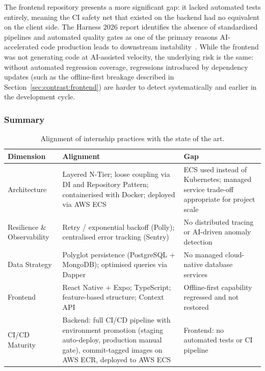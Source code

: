 The frontend repository presents a more significant gap: it lacked
automated tests entirely, meaning the CI safety net that existed on
the backend had no equivalent on the client side. The Harness 2026
report identifies the absence of standardised pipelines and
automated quality gates as one of the primary reasons AI-accelerated
code production leads to downstream instability~\cite{harness2026devops}.
While the frontend was not generating code at AI-assisted velocity,
the underlying risk is the same: without automated regression
coverage, regressions introduced by dependency updates (such as the
offline-first breakage described in Section~\ref{sec:contrast:frontend})
are harder to detect systematically and earlier in the development
cycle.
 
\newpage
\subsubsection{Summary}\label{subsub:contrast:summary}
 
\begin{table}[ht]
\centering
\small
\renewcommand{\arraystretch}{1.4}
\begin{tabular}{@{} >{\centering\arraybackslash}m{3.2cm}
                    >{\centering\arraybackslash}m{5.8cm}
                    >{\centering\arraybackslash}m{5.8cm} @{}}
\toprule
\textbf{Dimension} & \textbf{Alignment} & \textbf{Gap} \\
\midrule
 
Architecture &
  Layered N-Tier; loose coupling via DI and Repository Pattern;
  containerised with Docker; deployed via AWS ECS &
  ECS used instead of Kubernetes; managed service trade-off
  appropriate for project scale \\
 
Resilience \& Observability &
  Retry / exponential backoff (Polly); centralised error
  tracking (Sentry) &
  No distributed tracing or AI-driven anomaly detection \\
 
Data Strategy &
  Polyglot persistence (PostgreSQL + MongoDB); optimised
  queries via Dapper &
  No managed cloud-native database services \\
 
Frontend &
  React Native + Expo; TypeScript; feature-based structure;
  Context API &
  Offline-first capability regressed and not restored \\
 
CI/CD Maturity &
  Backend: full CI/CD pipeline with environment promotion
  (staging auto-deploy, production manual gate), commit-tagged
  images on AWS ECR, deployed to AWS ECS &
  Frontend: no automated tests or CI pipeline \\
 
\bottomrule
\end{tabular}
\caption{Alignment of internship practices with the state of the art.}
\label{tab:contrast}
\end{table}
 
